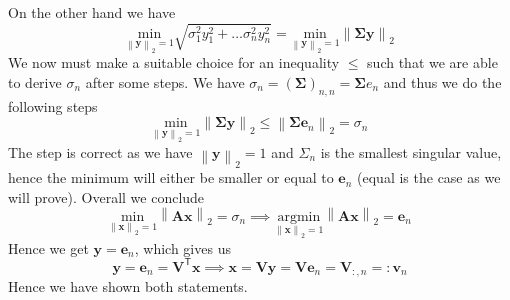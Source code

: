 \documentclass{article}
\begin{document}
 \noindent On the other hand we have 
 \begin{equation*}
     \underset{\left\lVert \mathbf{y}\right\rVert_{2} = 1}{\text{min}}\sqrt{\sigma_{1}^{2}y_{1}^{2} + \dots \sigma_{n}^{2}y_{n}^{2}} = \underset{\left\lVert \mathbf{y}\right\rVert_{2} = 1}{\text{min}}\left\lVert \mathbf{\Sigma}\mathbf{y}\right\rVert_{2} 
 \end{equation*}
We now must make a suitable choice for an inequality $\leq$ such that we are able to derive $\sigma_{n}$ after some steps. We have $\sigma_{n} = \left(\mathbf{\Sigma}\right)_{n,n} = \mathbf{\Sigma} e_{n}$ and thus we do the following steps
\begin{equation*}
  \underset{\left\lVert \mathbf{y}\right\rVert_{2} = 1}{\text{min}}\left\lVert \mathbf{\Sigma}\mathbf{y}\right\rVert_{2}  \leq \left\lVert \mathbf{\Sigma}\mathbf{e}_{n}\right\rVert_{2} = \sigma_{n}  
\end{equation*}
The step is correct as we have $\left\lVert \mathbf{y}\right\rVert_{2} = 1$ and $\Sigma_{n}$ is the smallest singular value, hence the minimum will either be smaller or equal to $\mathbf{e}_{n}$ (equal is the case as we will prove). Overall we conclude
\begin{equation*}
   \underset{\left\lVert \mathbf{x}\right\rVert_{2} = 1}{\text{min}}\left\lVert \mathbf{A}\mathbf{x}\right\rVert_{2} = \sigma_{n} \implies \underset{\left\lVert \mathbf{x}\right\rVert_{2} = 1}{\text{argmin}}\left\lVert \mathbf{A}\mathbf{x}\right\rVert_{2} = \mathbf{e}_{n}
\end{equation*} 
Hence we get $\mathbf{y} = \mathbf{e}_{n} $, which gives us
\begin{equation*}
   \mathbf{y} = \mathbf{e}_{n} = \mathbf{V}^{\mathsf{T}}\mathbf{x} \implies \mathbf{x} = \mathbf{V}\mathbf{y} = \mathbf{V}\mathbf{e}_{n} = \mathbf{V}_{:,n} =: \mathbf{v}_{n}
\end{equation*}
Hence we have shown both statements.
\end{document}
